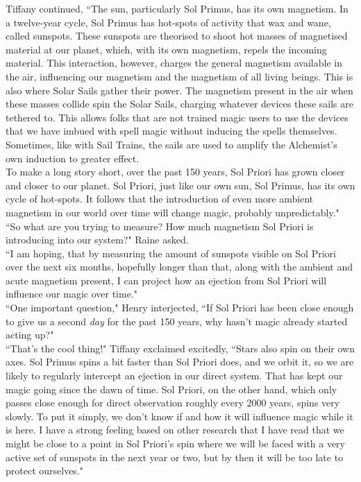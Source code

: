 Tiffany continued, ``The sun, particularly Sol Primus, has its own magnetism. In a twelve-year cycle, Sol Primus has hot-spots of activity that wax and wane, called sunspots. These sunspots are theorised to shoot hot masses of magnetised material at our planet, which, with its own magnetism, repels the incoming material. This interaction, however, charges the general magnetism available in the air, influencing our magnetism and the magnetism of all living beings. This is also where Solar Sails gather their power. The magnetism present in the air when these masses collide spin the Solar Sails, charging whatever devices these sails are tethered to. This allows folks that are not trained magic users to use the devices that we have imbued with spell magic without inducing the spells themselves.
Sometimes, like with Sail Trains, the sails are used to amplify the Alchemist's own induction to greater effect.\\
To make a long story short, over the past 150 years, Sol Priori has grown closer and closer to our planet. Sol Priori, just like our own sun, Sol Primus, has its own cycle of hot-spots. It follows that the introduction of even more ambient magnetism in our world over time will change magic, probably unpredictably."\\

``So what are you trying to measure? How much magnetism Sol Priori is introducing into our system?" Raine asked.\\
``I am hoping, that by measuring the amount of sunspots visible on Sol Priori over the next six months, hopefully longer than that, along with the ambient and acute magnetism present, I can project how an ejection from Sol Priori will influence our magic over time."\\
``One important question," Henry interjected, ``If Sol Priori has been close enough to give us a second \textit{day} for the past 150 years, why hasn't magic already started acting up?"\\

``That's the cool thing!" Tiffany exclaimed excitedly, ``Stars also spin on their own axes. Sol Primus spins a bit faster than Sol Priori does, and we orbit it, so we are likely to regularly intercept an ejection in our direct system. That has kept our magic going since the dawn of time. Sol Priori, on the other hand, which only passes close enough for direct observation roughly every 2000 years, spins very slowly. To put it simply, we don't know if and how it will influence magic while it is here. I have a strong feeling based on other research that I have read that we might be close to a point in Sol Priori's spin where we will be faced with a very active set of sunspots in the next year or two, but by then it will be too late to protect ourselves."\\

